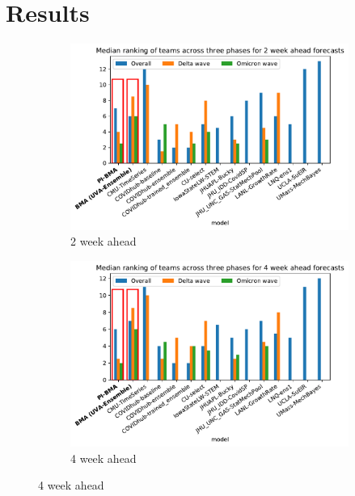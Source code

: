 \documentclass[conference,compsoc]{IEEEtran}
\begin{document}
\section{Results}
\begin{figure}[ht!]
    \centering
    \begin{subfigure}{.5\textwidth}
    \includegraphics[width=.99\textwidth]{figs/pred_PI_BMA_2_wk_median_rank_various_weeks_seq_v2.pdf}
    \caption{2 week ahead}
    \label{fig:2wk_ranking}
    \end{subfigure}
    \begin{subfigure}{.5\textwidth}
      \includegraphics[width=.99\textwidth]{figs/pred_PI_BMA_4_wk_median_rank_various_weeks_seq_v2.pdf}
      \caption{4 week ahead}
      \label{fig:4wk_ranking}
     

\end{subfigure}
\end{figure}
\end{document}
